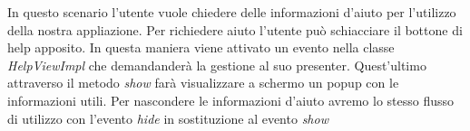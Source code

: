 In questo scenario l'utente vuole chiedere delle informazioni d'aiuto per l'utilizzo della nostra appliazione. Per richiedere aiuto l'utente può schiacciare il bottone di help apposito. In questa maniera viene attivato un evento nella classe \textit{HelpViewImpl} che demandanderà la gestione al suo presenter. Quest'ultimo attraverso il metodo \textit{show} farà visualizzare a schermo un popup con le informazioni utili. Per nascondere le informazioni d'aiuto avremo lo stesso flusso di utilizzo con l'evento \textit{hide} in sostituzione al evento \textit{show}

